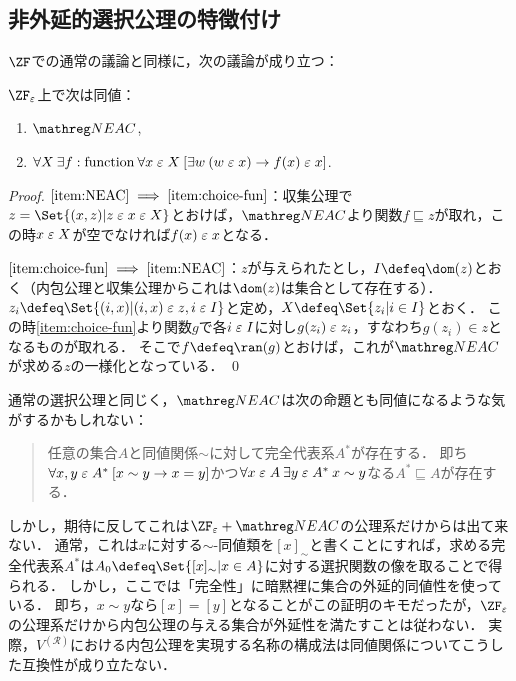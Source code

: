 \documentclass[realisability.tex]{subfiles}
\begin{document}
\subsection{非外延的選択公理の特徴付け}
$\ZF$での通常の議論と同様に，次の議論が成り立つ：
\begin{lemma}
 $\ZFe$上で次は同値：
 \begin{enumerate}
  \item \label{item:NEAC} $\NEAC$,
  \item \label{item:choice-fun} $\forall X \: \exists f: \text{function}\: \forall x \mathrel{\varepsilon} X \: [\exists w \: (w \mathrel{\varepsilon} x) \to f(x) \mathrel{\varepsilon} x]$.
 \end{enumerate}
\end{lemma}
\begin{proof}
 $\ref{item:NEAC} \implies \ref{item:choice-fun}$：収集公理で$z = \Set{(x, z) | z \strin x \strin X}$とおけば，$\NEAC$より関数$f \sqsubseteq z$が取れ，この時$x \mathrel{\varepsilon} X$が空でなければ$f(x) \mathrel{\varepsilon} x$となる．

 $\ref{item:choice-fun} \implies \ref{item:NEAC}$：$z$が与えられたとし，$I \defeq \dom(z)$とおく（内包公理と収集公理からこれは$\dom(z)$は集合として存在する）．
 $z_i \defeq \Set{(i, x) | (i, x) \strin z, i \strin I}$と定め，$X \defeq \Set{z_i |  i \in I}$とおく．
 この時\ref{item:choice-fun}より関数$g$で各$i \mathrel{\varepsilon} I$に対し$g(z_i) \mathrel{\varepsilon} z_i$，すなわち$g(z_i) \in z$となるものが取れる．
 そこで$f \defeq \ran(g)$とおけば，これが$\NEAC$が求める$z$の一様化となっている． \qed
\end{proof}

\begin{remark}
 通常の選択公理と同じく，$\NEAC$は次の命題とも同値になるような気がするかもしれない：
 \begin{quote}
  任意の集合$A$と同値関係$\sim$に対して完全代表系$A^*$が存在する．
  即ち$\forall x, y \mathrel{\varepsilon} A^* \: [x \sim y \to x = y]$かつ$\forall x \mathrel{\varepsilon} A\: \exists y \mathrel{\varepsilon} A^* \: x \sim y$なる$A^* \sqsubseteq A$が存在する．
 \end{quote}
 しかし，期待に反してこれは$\ZFe + \NEAC$の公理系だけからは出て来ない．
 通常，これは$x$に対する$\sim$-同値類を$[x]_{\sim}$と書くことにすれば，求める完全代表系$A^*$は$A_0 \defeq \Set{[x]_{\sim} | x \in A}$に対する選択関数の像を取ることで得られる．
 しかし，ここでは「完全性」に暗黙裡に集合の外延的同値性を使っている．
 即ち，$x \sim y$なら$[x] = [y]$となることがこの証明のキモだったが，$\ZFe$の公理系だけから内包公理の与える集合が外延性を満たすことは従わない．
 実際，$V^{(\mathcal{R})}$における内包公理を実現する名称の構成法は同値関係についてこうした互換性が成り立たない．
\end{remark}
\end{document}
